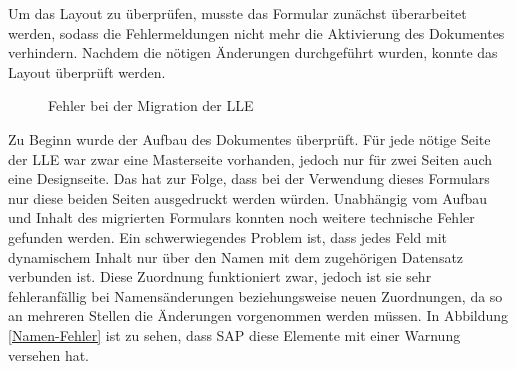Um das Layout zu überprüfen, musste das Formular zunächst überarbeitet werden, sodass die Fehlermeldungen nicht mehr die Aktivierung des Dokumentes verhindern. Nachdem die nötigen Änderungen durchgeführt wurden, konnte das Layout überprüft werden. 
\begin{figure}[ht]
	\centering
	\caption{Fehler bei der Migration der \acs{LLE}}
	\label{Migration}
\end{figure}

Zu Beginn wurde der Aufbau des Dokumentes überprüft. Für jede nötige Seite der \ac{LLE} war zwar eine Masterseite vorhanden, jedoch nur für zwei Seiten auch eine Designseite. Das hat zur Folge, dass bei der Verwendung dieses Formulars nur diese beiden Seiten ausgedruckt werden würden. Unabhängig vom Aufbau und Inhalt des migrierten Formulars konnten noch weitere technische Fehler gefunden werden. Ein schwerwiegendes Problem ist, dass jedes Feld mit dynamischem Inhalt nur über den Namen mit dem zugehörigen Datensatz verbunden ist. Diese Zuordnung funktioniert zwar, jedoch ist sie sehr fehleranfällig bei Namensänderungen beziehungsweise neuen Zuordnungen, da so an mehreren Stellen die Änderungen vorgenommen werden müssen. In Abbildung \ref{Namen-Fehler} ist zu sehen, dass SAP diese Elemente mit einer Warnung versehen hat.



